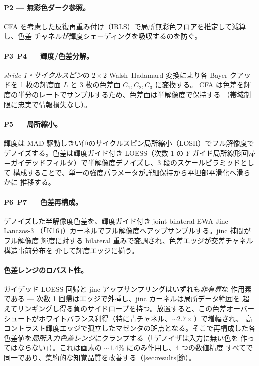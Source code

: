 \documentclass[twocolumn,10pt]{ltjsarticle}
\begin{document}
\paragraph{P2 --- 無彩色ダーク参照。}
CFA を考慮した反復再重み付け（IRLS）で局所無彩色フロアを推定して減算し、色差
チャネルが輝度シェーディングを吸収するのを防ぐ。

\paragraph{P3--P4 --- 輝度/色差分解。}
\emph{stride-1・サイクルスピン}の $2{\times}2$ Walsh--Hadamard 変換により各
Bayer クアッドを 1 枚の輝度面 $L$ と 3 枚の色差面 $C_1,C_2,C_3$ に変換する。
CFA は色差を輝度の半分のレートでサンプルするため、色差面は半解像度で保持する
（帯域制限に忠実で情報損失なし）。

\paragraph{P5 --- 局所縮小。}
輝度は MAD 駆動しきい値のサイクルスピン局所縮小（LOSH）でフル解像度で
デノイズする。色差は輝度ガイド付き LOESS（次数 1 の $Y$ ガイド局所線形回帰
＝ガイデッドフィルタ）で半解像度デノイズし、3 段のスケールピラミッドとして
構成することで、単一の強度パラメータが詳細保持から平坦部平滑化へ滑らかに
推移する。

\paragraph{P6--P7 --- 色差再構成。}
デノイズした半解像度色差を、輝度ガイド付き joint-bilateral EWA Jinc-Lanczos-3
（「K16」）カーネルでフル解像度へアップサンプルする。jinc 補間がフル解像度
輝度に対する bilateral 重みで変調され、色差エッジが交差チャネル構造事前分布を
介して輝度エッジに揃う。

\paragraph{色差レンジのロバスト性。}
ガイデッド LOESS 回帰と jinc アップサンプリングはいずれも\emph{非有界}な
作用素である --- 次数 1 回帰はエッジで外挿し、jinc カーネルは局所データ範囲を
超えてリンギングし得る負のサイドローブを持つ。放置すると、この色差オーバー
シュートがホワイトバランス利得（特に青チャネル、$\sim\!2.7\times$）で増幅され、
高コントラスト輝度エッジで孤立したマゼンタの斑点となる。そこで再構成した各
色差値を\emph{局所入力色差レンジ}にクランプする（「デノイザは入力に無い色を
作ってはならない」）。これは画素の $\sim\!1.4\%$ にのみ作用し、4 つの数値精度
すべてで同一であり、集約的な知覚品質を改善する（\ref{sec:results}節）。
\end{document}
